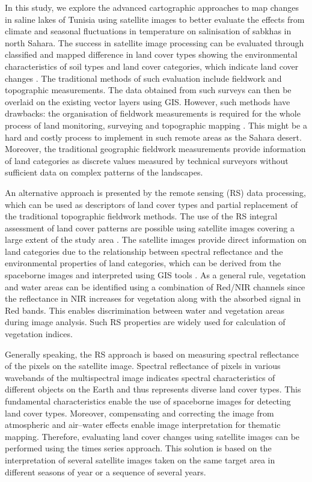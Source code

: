 \documentclass[land,article,accept,pdftex,moreauthors]{Definitions/mdpi}
\begin{document}
{In this study,} we explore the advanced cartographic approaches to map changes in saline lakes of Tunisia using satellite images to better evaluate the effects from climate and seasonal fluctuations in temperature on salinisation of sabkhas in north Sahara. The success in satellite image processing can be evaluated through classified and mapped difference in land cover types showing {the }environmental characteristics {of soil types} and land {cover }categories, which indicate land cover changes \cite{Shoshany}. The traditional methods of {such }evaluation include {fieldwork} and topographic measurements{. The data obtained from such surveys can then be overlaid on} the existing vector layers using GIS. However, such methods have{ drawbacks: }the organisation {of} fieldwork measurements is required for the whole process of land monitoring, surveying and topographic mapping \cite{JENDOUBI2020100507}. This might be a hard and costly {process }to implement in {such} remote areas {as} the Sahara desert. Moreover, {the }traditional geographic fieldwork measurements provide information of land categories as discrete values measured by  {technical} surveyors without {sufficient }data on complex patterns of the landscapes. 

An alternative approach is presented by {the remote sensing (RS)} data {processing}, which can be used as descriptors of land cover types and partial replacement of the traditional topographic fieldwork methods. {The }use of the RS integral assessment of land cover patterns are possible using satellite images {covering} a large extent of the {study} area \cite{ELGHOUL2023106733}. {The} satellite images provide direct information on land categories due to the relationship between spectral reflectance and the environmental properties of land categories, {which can be derived from the} spaceborne images {and interpreted using GIS tools} \cite{Allouche,Ruiz,Ray}. As a general rule, vegetation and water areas can be identified using a combination of Red/NIR channels since the reflectance in NIR {increases} for vegetation along with the absorbed signal in Red bands{. This enables} discrimination between water and vegetation areas {during} image analysis. Such RS properties are widely used for calculation of vegetation indices. 

{Generally speaking, the RS} approach is based on measuring {spectral} reflectance of the pixels on the satellite image{. }Spectral reflectance of {pixels} in various wavebands of the multispectral {image }indicates spectral characteristics of different objects on the Earth {and thus represents diverse land cover types}. This fundamental characteristics enable the use of {spaceborne }images for detecting land cover types. {Moreover, compensating and correcting the image from atmospheric and air--water effects enable }image interpretation {for thematic mapping}. Therefore, evaluating land cover {changes using} satellite images{ can} be performed using the times series approach{. This solution is based on the} interpretation of several satellite images taken on the same target area in different seasons of year or a sequence of several years. 
\end{document}
